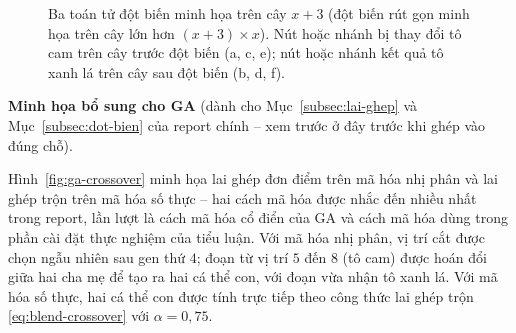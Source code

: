 \begin{figure}[htbp]
\caption{Ba toán tử đột biến minh họa trên cây $x+3$ (đột biến rút
gọn minh họa trên cây lớn hơn $(x+3)\times x$). Nút hoặc nhánh bị thay
đổi tô cam trên cây trước đột biến (a, c, e); nút hoặc nhánh kết quả
tô xanh lá trên cây sau đột biến (b, d, f).}
\label{fig:gp-mutation}
\end{figure}

\newpage
\textbf{Minh họa bổ sung cho GA} (dành cho Mục~\ref{subsec:lai-ghep} và
Mục~\ref{subsec:dot-bien} của report chính -- xem trước ở đây trước khi
ghép vào đúng chỗ).

Hình~\ref{fig:ga-crossover} minh họa lai ghép đơn điểm trên mã hóa nhị
phân và lai ghép trộn trên mã hóa số thực -- hai cách mã hóa được nhắc
đến nhiều nhất trong report, lần lượt là cách mã hóa cổ điển của GA và
cách mã hóa dùng trong phần cài đặt thực nghiệm của tiểu luận. Với mã
hóa nhị phân, vị trí cắt được chọn ngẫu nhiên sau gen thứ $4$; đoạn từ
vị trí $5$ đến $8$ (tô cam) được hoán đổi giữa hai cha mẹ để tạo ra hai
cá thể con, với đoạn vừa nhận tô xanh lá. Với mã hóa số thực, hai cá
thể con được tính trực tiếp theo công thức lai ghép trộn
\eqref{eq:blend-crossover} với $\alpha = 0{,}75$.

